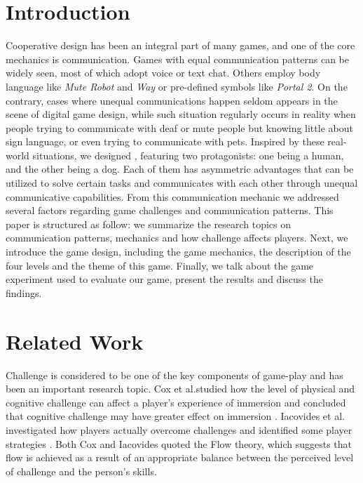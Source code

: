 \documentclass{sigchi}
\begin{document}
\section{Introduction}
Cooperative design has been an integral part of many games, and one of the core mechanics is communication. Games with equal communication patterns can be widely seen, most of which adopt voice or text chat. Others employ body language like \textit{Mute Robot}\cite{MuteRobot} and \textit{Way}\cite{Way} or pre-defined symbols like \textit{Portal 2}\cite{Portal2}. On the contrary, cases where unequal communications happen seldom appears in the scene of digital game design, while such situation regularly occurs in reality when people trying to communicate with deaf or mute people but knowing little about sign language, or even trying to communicate with pets. Inspired by these real-world situations, we designed \getGameName, featuring two protagonists: one being a human, and the other being a dog.  Each of them has asymmetric advantages that can be utilized to solve certain tasks and communicates with each other through unequal communicative capabilities. From this communication mechanic we addressed several factors regarding game challenges and communication patterns.
This paper is structured as follow: we summarize the research topics on communication patterns, mechanics and how challenge affects players. Next, we introduce the game design, including the game mechanics, the description of the four levels and the theme of this game. Finally, we talk about the game experiment used to evaluate our game, present the results and discuss the findings.
\section{Related Work}
Challenge is considered to be one of the key components of game-play and has been an important research topic. Cox et al.studied how the level of physical and cognitive challenge can affect a player's experience of immersion and concluded that cognitive challenge may have greater effect on immersion \cite{Chall1}. Iacovides et al. investigated how players actually overcome challenges and identified some player strategies \cite{Chall2}. Both Cox and Iacovides quoted the Flow theory\cite{PsyFlow}, which suggests that flow is achieved as a result of an appropriate balance between the perceived level of challenge and the person's skills.
\end{document}
